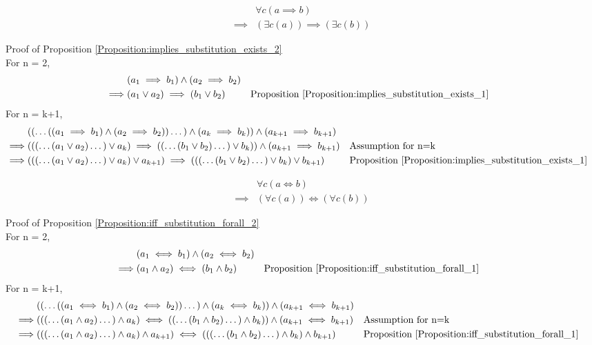 \begin{prop}
\label{Proposition:implies_substitution_exists_2}
\begin{align*}
& \forall c (a \implies b) \\
\implies & (\exists c (a)) \implies (\exists c (b))
\end{align*}
\end{prop}

Proof of Proposition \ref{Proposition:implies_substitution_exists_2} \\
For n = 2,
\begin{align*}
& (a_1 \implies b_1) \land (a_2 \implies b_2) \\
\implies & (a_1 \lor a_2) \implies (b_1 \lor b_2)
& & \text{Proposition \ref{Proposition:implies_substitution_exists_1}} \\
\end{align*}
For n = k+1,
\begin{align*}
& (( \dots ((a_1 \implies b_1) \land (a_2 \implies b_2)) \dots ) \land (a_k \implies b_k)) \land (a_{k+1} \implies b_{k+1}) \\
\implies & ((( \dots (a_1 \lor a_2) \dots ) \lor a_k) \implies (( \dots (b_1 \lor b_2) \dots ) \lor b_k)) \land (a_{k+1} \implies b_{k+1})
& & \text{Assumption for n=k} \\
\implies & ((( \dots (a_1 \lor a_2) \dots ) \lor a_k) \lor a_{k+1}) \implies ((( \dots (b_1 \lor b_2) \dots ) \lor b_k) \lor b_{k+1})
& & \text{Proposition \ref{Proposition:implies_substitution_exists_1}} \\
\end{align*}

\begin{prop}
\label{Proposition:iff_substitution_forall_2}
\begin{align*}
& \forall c (a \iff b) \\
\implies & (\forall c (a)) \iff (\forall c (b))
\end{align*}
\end{prop}

Proof of Proposition \ref{Proposition:iff_substitution_forall_2} \\
For n = 2,
\begin{align*}
& (a_1 \iff b_1) \land (a_2 \iff b_2) \\
\implies & (a_1 \land a_2) \iff (b_1 \land b_2)
& & \text{Proposition \ref{Proposition:iff_substitution_forall_1}} \\
\end{align*}
For n = k+1,
\begin{align*}
& (( \dots ((a_1 \iff b_1) \land (a_2 \iff b_2)) \dots ) \land (a_k \iff b_k)) \land (a_{k+1} \iff b_{k+1}) \\
\implies & ((( \dots (a_1 \land a_2) \dots ) \land a_k) \iff (( \dots (b_1 \land b_2) \dots ) \land b_k)) \land (a_{k+1} \iff b_{k+1})
& & \text{Assumption for n=k} \\
\implies & ((( \dots (a_1 \land a_2) \dots ) \land a_k) \land a_{k+1}) \iff ((( \dots (b_1 \land b_2) \dots ) \land b_k) \land b_{k+1})
& & \text{Proposition \ref{Proposition:iff_substitution_forall_1}} \\
\end{align*}

